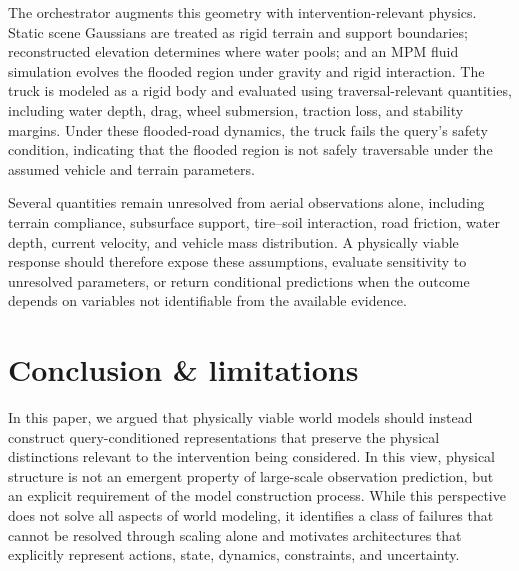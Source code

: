 \documentclass{article}
\begin{document}
The orchestrator augments this geometry with intervention-relevant physics. Static scene Gaussians are treated as rigid terrain and support boundaries; reconstructed elevation determines where water pools; and an MPM fluid simulation evolves the flooded region under gravity and rigid interaction. The truck is modeled as a rigid body and evaluated using traversal-relevant quantities, including water depth, drag, wheel submersion, traction loss, and stability margins. Under these flooded-road dynamics, the truck fails the query’s safety condition, indicating that the flooded region is not safely traversable under the assumed vehicle and terrain parameters.

Several quantities remain unresolved from aerial observations alone, including terrain compliance, subsurface support, tire--soil interaction, road friction, water depth, current velocity, and vehicle mass distribution. A physically viable response should therefore expose these assumptions, evaluate sensitivity to unresolved parameters, or return conditional predictions when the outcome depends on variables not identifiable from the available evidence.

\section{Conclusion \& limitations}

In this paper, we argued that physically viable world models should instead construct query-conditioned representations that preserve the physical distinctions relevant to the intervention being considered. In this view, physical structure is not an emergent property of large-scale observation prediction, but an explicit requirement of the model construction process. While this perspective does not solve all aspects of world modeling, it identifies a class of failures that cannot be resolved through scaling alone and motivates architectures that explicitly represent actions, state, dynamics, constraints, and uncertainty.
\end{document}
